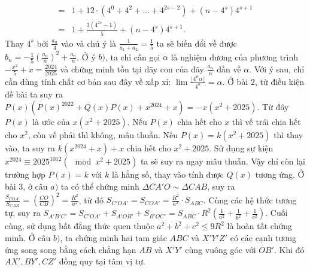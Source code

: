 \begin{multicols}{2}
\begin{align*}
			= &1 \!+\! 12\cdot(4^0 \!+\! 4^2 \!+\! ... \!+\! 4^{2s \!-\! 2}) \!+\! (n \!-\! 4^s)4^{s \!+\! 1}\\
			= &1 + \frac{3(4^{2s} - 1)}{5} + (n - 4^s)4^{s + 1}.
	\end{align*}
	Thay $4^s$ bởi $\frac{a_n}{4}$ vào và chú ý là  $\frac{1}{{{a_1} + {a_2}}} = \frac{1}{5}$  ta sẽ biến đổi về được ${b_n} =  - \frac{1}{5}{\left( {\frac{{{a_n}}}{n}} \right)^2} + \frac{{{a_n}}}{n}$. Ở ý $b)$, ta chỉ cần gọi $\alpha$ là nghiệm dương của phương trình  $- \frac{{{x^2}}}{5} + x = \frac{{2024}}{{2025}}$ và chứng minh tồn tại dãy con của dãy $\frac{a_n}{n}$  dần về $\alpha$. Với ý sau, chỉ cần dùng tính chất cơ bản sau đây về xấp xỉ:  $\lim \frac{{\lfloor{4^n}\alpha \rfloor}}{{{4^n}}} = \alpha$. 
	\vskip 0.1cm
	Ở bài $2$, từ điều kiện đề bài ta suy ra  $P(x)(P(x)^{2022} + Q(x)P(x) + x^{2024} + x) = - x(x^2+2025)$.
	\vskip 0.1cm
	Từ đây $P(x)$ là ước của $x(x^2+2025)$. Nếu $P(x)$ chia hết cho $x$ thì vế trái chia hết cho $x^2$, còn vế phải thì không, mâu thuẫn. Nếu $P(x) = k(x^2+2025)$ thì thay vào, ta suy ra $k(x^{2024}+x) + x$ chia hết cho $x^2 + 2025$. Sử dụng sự kiện $x^{2024} \equiv 2025^{1012} (\mod x^2 + 2025)$ ta sẽ suy ra ngay mâu thuẫn. Vậy chỉ còn lại trường hợp $P(x) = k$ với $k$ là hằng số, thay vào tính được $Q(x)$ tương ứng. 
	\vskip 0.1cm
	Ở bài $3$, ở câu $a)$ ta có thể chứng minh $\Delta CA'O \sim \Delta CAB$, suy ra $\frac{{{S_{COA'}}}}{{{S_{CAB}}}} = {\left( {\frac{{CO}}{{CB}}} \right)^2} = \frac{{{R^2}}}{{{a^2}}}$, từ đó  ${S_{C'OA'}} = {S_{COA'}} = \frac{{{R^2}}}{{{a^2}}} \cdot {S_{ABC}}$. Cùng các hệ thức tương tự, suy ra ${S_{A'B'C'}} = {S_{C'OA'}} + {S_{A'OB'}} + {S_{B'OC'}} = {S_{ABC}} \cdot {R^2}\left( {\frac{1}{{{a^2}}} + \frac{1}{{{b^2}}} + \frac{1}{{{c^2}}}} \right)$. Cuối cùng, sử dụng bất đẳng thức quen thuộc $a^2 + b^2 + c^2 \le 9R^2$ là hoàn tất chứng minh. Ở câu $b)$, ta chứng minh hai tam giác $ABC$  và $X'Y'Z'$  có các cạnh tương ứng song song bằng cách chẳng hạn $AB$  và $X'Y'$ cùng vuông góc với $OB'$. Khi đó $AX',BY',CZ'$  đồng quy tại tâm vị tự. 
	\vskip 0.1cm

\end{multicols}
